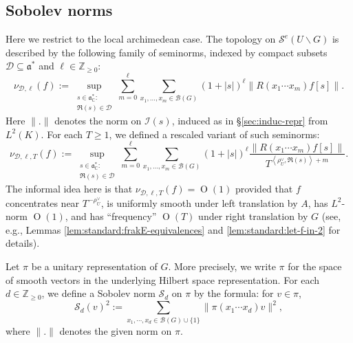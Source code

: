 \documentclass[reqno]{amsart}
\def\O{\operatorname{O}}
\theoremstyle{plain} \newtheorem{theorem} {Theorem}
\theoremstyle{definition} \newtheorem{definition} [theorem] {Definition}
\theoremstyle{itplain} %
\numberwithin{equation}{section}
\numberwithin{theorem}{section}
\renewcommand{\geq}{\geqslant}
\begin{document}
\subsection{Sobolev norms}\label{sec:local-sobolev-norms-prelims}
Here we restrict to the local archimedean case.  The topology on $\mathcal{S}^e(U \backslash G)$ is described by the following family of seminorms, indexed by compact subsets $\mathcal{D} \subseteq \mathfrak{a}^*$ and $\ell \in \mathbb{Z}_{\geq 0}$:  
\begin{equation}\label{eq:nu_mathcald-ellf-:=}
  \nu_{\mathcal{D},\ell}(f) :=
  \sup _{
    \substack{
      s \in \mathfrak{a}_{\mathbb{C}}^* :  \\
       \Re(s) \in \mathcal{D} 
    }
  }
  \sum_{m=0}^{\ell}
  \sum_{x_1,\dotsc,x_m \in \mathcal{B}(G)}
  (1 + |s|)^{\ell}
  \|R(x_1 \dotsb x_m) f[s] \|.
\end{equation}
Here $\|.\|$ denotes the norm on $\mathcal{I}(s)$, induced as in \S\ref{sec:induc-repr} from $L^2(K)$.  For each $T \geq 1$, we defined a rescaled variant of such seminorms: 
\begin{equation*}
  \nu_{\mathcal{D},\ell,T}(f) :=
  \sup _{
    \substack{
      s \in \mathfrak{a}_{\mathbb{C}}^* :  \\
       \Re(s) \in \mathcal{D} 
    }
  }
  \sum_{m=0}^{\ell}
  \sum_{x_1,\dotsc,x_m \in \mathcal{B}(G)}
  (1 + |s|)^{\ell}
  \frac{\|R(x_1 \dotsb x_m) f[s] \|}{T ^{\left\langle \rho_U^\vee , \Re(s) \right\rangle + m}}.
\end{equation*}
The informal idea here is that $\nu_{\mathcal{D},\ell,T}(f) = \O(1)$ provided that $f$ concentrates near $T^{-\rho_U^\vee}$, is uniformly smooth under left translation by $A$, has $L^2$-norm $\O(1)$, and has ``frequency'' $\O(T)$ under right translation by $G$ (see, e.g., Lemmas \ref{lem:standard:frakE-equivalences} and \ref{lem:standard:let-f-in-2} for details).

Let $\pi$ be a unitary representation of $G$.  More precisely, we write $\pi$ for the space of smooth vectors in the underlying Hilbert space representation.  For each $d \in \mathbb{Z}_{\geq 0}$, we define a Sobolev norm $\mathcal{S}_d$ on $\pi$ by the formula: for $v \in \pi$,  
\begin{equation}\label{eq:mathc-:=-sum_x_1}
  \mathcal{S}_d(v)^2 := \sum_{x_1,\dotsb,x_d \in \mathcal{B}(G) \cup \{1\}} \| \pi(x_1 \dotsb x_d) v\|^2,
\end{equation}
where $\|.\|$ denotes the given norm on $\pi$.
\end{document}
